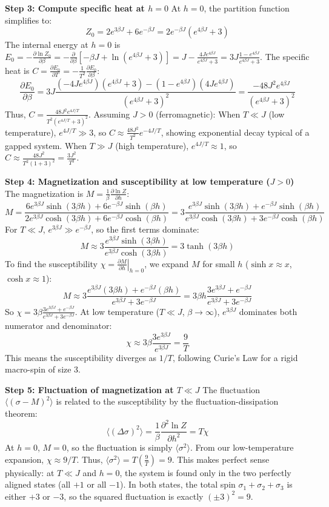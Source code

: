 \begin{solution}
\textbf{Step 3: Compute specific heat at $h=0$}
At $h=0$, the partition function simplifies to:
\[ Z_0 = 2e^{3\beta J} + 6e^{-\beta J} = 2e^{-\beta J} (e^{4\beta J} + 3) \]
The internal energy at $h=0$ is $E_0 = -\frac{\partial \ln Z_0}{\partial \beta} = - \frac{\partial}{\partial \beta} [-\beta J + \ln(e^{4\beta J} + 3)] = J - \frac{4J e^{4\beta J}}{e^{4\beta J} + 3} = 3J \frac{1 - e^{4\beta J}}{e^{4\beta J} + 3}$.
The specific heat is $C = \frac{\partial E_0}{\partial T} = -\frac{1}{T^2} \frac{\partial E_0}{\partial \beta}$:
\[ \frac{\partial E_0}{\partial \beta} = 3J \frac{(-4J e^{4\beta J})(e^{4\beta J} + 3) - (1 - e^{4\beta J})(4J e^{4\beta J})}{(e^{4\beta J} + 3)^2} = \frac{-48 J^2 e^{4\beta J}}{(e^{4\beta J} + 3)^2} \]
Thus, $C = \frac{48 J^2 e^{4J/T}}{T^2 (e^{4J/T} + 3)^2}$.
Assuming $J > 0$ (ferromagnetic):
When $T \ll J$ (low temperature), $e^{4J/T} \gg 3$, so $C \approx \frac{48 J^2}{T^2} e^{-4J/T}$, showing exponential decay typical of a gapped system.
When $T \gg J$ (high temperature), $e^{4J/T} \approx 1$, so $C \approx \frac{48 J^2}{T^2 (1+3)^2} = \frac{3 J^2}{T^2}$.

\textbf{Step 4: Magnetization and susceptibility at low temperature ($J>0$)}
The magnetization is $M = \frac{1}{\beta} \frac{\partial \ln Z}{\partial h}$:
\[ M = \frac{ 6e^{3\beta J}\sinh(3\beta h) + 6e^{-\beta J}\sinh(\beta h) }{ 2e^{3\beta J}\cosh(3\beta h) + 6e^{-\beta J}\cosh(\beta h) } = 3 \frac{ e^{3\beta J}\sinh(3\beta h) + e^{-\beta J}\sinh(\beta h) }{ e^{3\beta J}\cosh(3\beta h) + 3e^{-\beta J}\cosh(\beta h) } \]
For $T \ll J$, $e^{3\beta J} \gg e^{-\beta J}$, so the first terms dominate:
\[ M \approx 3 \frac{e^{3\beta J}\sinh(3\beta h)}{e^{3\beta J}\cosh(3\beta h)} = 3 \tanh(3\beta h) \]
To find the susceptibility $\chi = \left. \frac{\partial M}{\partial h} \right|_{h=0}$, we expand $M$ for small $h$ ($\sinh x \approx x$, $\cosh x \approx 1$):
\[ M \approx 3 \frac{ e^{3\beta J}(3\beta h) + e^{-\beta J}(\beta h) }{ e^{3\beta J} + 3e^{-\beta J} } = 3\beta h \frac{ 3e^{3\beta J} + e^{-\beta J} }{ e^{3\beta J} + 3e^{-\beta J} } \]
So $\chi = 3\beta \frac{ 3e^{3\beta J} + e^{-\beta J} }{ e^{3\beta J} + 3e^{-\beta J} }$.
At low temperature ($T \ll J$, $\beta \to \infty$), $e^{3\beta J}$ dominates both numerator and denominator:
\[ \chi \approx 3\beta \frac{3e^{3\beta J}}{e^{3\beta J}} = \frac{9}{T} \]
This means the susceptibility diverges as $1/T$, following Curie's Law for a rigid macro-spin of size 3.

\textbf{Step 5: Fluctuation of magnetization at $T \ll J$}
The fluctuation $\langle (\sigma - M)^2 \rangle$ is related to the susceptibility by the fluctuation-dissipation theorem:
\[ \langle (\Delta \sigma)^2 \rangle = \frac{1}{\beta} \frac{\partial^2 \ln Z}{\partial h^2} = T \chi \]
At $h=0$, $M=0$, so the fluctuation is simply $\langle \sigma^2 \rangle$.
From our low-temperature expansion, $\chi \approx 9/T$.
Thus, $\langle \sigma^2 \rangle = T \left( \frac{9}{T} \right) = 9$.
This makes perfect sense physically: at $T \ll J$ and $h=0$, the system is found only in the two perfectly aligned states (all $+1$ or all $-1$). In both states, the total spin $\sigma_1+\sigma_2+\sigma_3$ is either $+3$ or $-3$, so the squared fluctuation is exactly $(\pm 3)^2 = 9$.
\end{solution}

